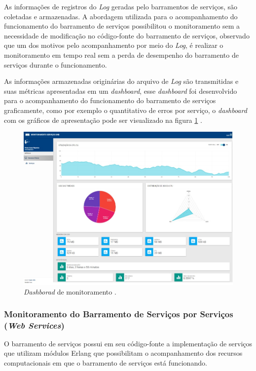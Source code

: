 As informações de registros do \textit{Log} geradas pelo barramentos de serviços, são coletadas e armazenadas. A abordagem utilizada para o acompanhamento do funcionamento do barramento de serviços possibilitou o monitoramento sem a necessidade de modificação no código-fonte do barramento de serviços, observado que um dos motivos pelo acompanhamento por meio do \textit{Log}, é realizar o monitoramento em tempo real sem a perda de desempenho  do barramento de serviços durante o funcionamento. 

As informações armazenadas originárias do arquivo de \textit{Log} são transmitidas e suas métricas apresentadas em um \textit{dashboard}, esse \textit{dashboard} foi desenvolvido para o acompanhamento do funcionamento do barramento de serviços graficamente, como por exemplo o quantitativo de erros por serviço, o \textit{dashboard} com os gráficos de apresentação pode ser visualizado na figura \ref{fun:fig:dashboardS} \cite{filgueirasmonitoramento}.

\begin{figure}[H]
	\begin{center}
	\includegraphics[scale = 0.70]{img/dashboard.jpg}
		\caption{\textit{Dashborad} de monitoramento \cite{filgueirasmonitoramento}.}
		\label{fun:fig:dashboardS}
	\end{center}
\end{figure}

\subsubsection{Monitoramento do Barramento de Serviços por Serviços (\textit{Web Services})}
O barramento de serviços possui em seu código-fonte a implementação de serviços que utilizam módulos Erlang que possibilitam o acompanhamento dos recursos computacionais em que o barramento de serviços está funcionando. 

